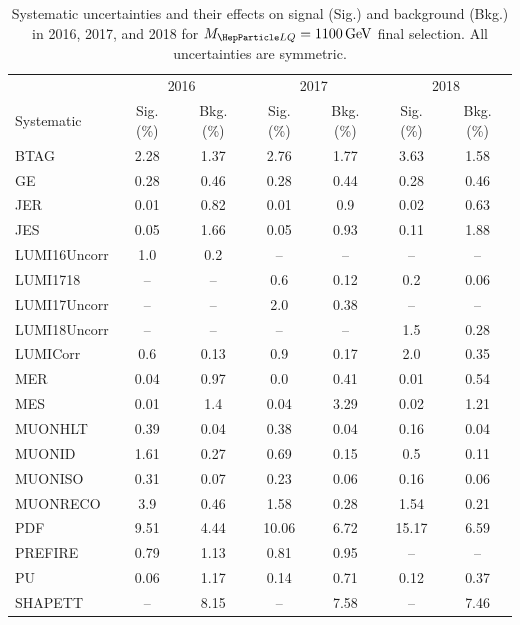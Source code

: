 \begin{table}[H]
	\begin{center}
        \begin{footnotesize}
			\caption{Systematic uncertainties and their effects on signal (Sig.) and background (Bkg.) in 2016, 2017, and 2018 for $\MLQ = \SI{1100}{GeV}$ final selection. All uncertainties are symmetric.}
			\begin{tabular}{lcccccc} \hline \hline
				& \multicolumn{2}{c}{2016} & \multicolumn{2}{c}{2017} & \multicolumn{2}{c}{2018} \\
				Systematic & Sig. (\%) & Bkg. (\%) & Sig. (\%) & Bkg. (\%) & Sig. (\%) & Bkg. (\%) \\ \hline
				BTAG &  2.28  &  1.37 &  2.76  &  1.77 &  3.63  &  1.58 \\
				GE &  0.28  &  0.46 &  0.28  &  0.44 &  0.28  &  0.46 \\
				JER &  0.01  &  0.82 &  0.01  &  0.9 &  0.02  &  0.63 \\
				JES &  0.05  &  1.66 &  0.05  &  0.93 &  0.11  &  1.88 \\
				LUMI16Uncorr &  1.0  &  0.2 & -- & -- & -- & -- \\
				LUMI1718 & -- & -- &  0.6  &  0.12 &  0.2  &  0.06 \\
				LUMI17Uncorr & -- & -- &  2.0  &  0.38 & -- & -- \\
				LUMI18Uncorr & -- & -- & -- & -- &  1.5  &  0.28 \\
				LUMICorr &  0.6  &  0.13 &  0.9  &  0.17 &  2.0  &  0.35 \\
				MER &  0.04  &  0.97 &  0.0  &  0.41 &  0.01  &  0.54 \\
				MES &  0.01  &  1.4 &  0.04  &  3.29 &  0.02  &  1.21 \\
				MUONHLT &  0.39  &  0.04 &  0.38  &  0.04 &  0.16  &  0.04 \\
				MUONID &  1.61  &  0.27 &  0.69  &  0.15 &  0.5  &  0.11 \\
				MUONISO &  0.31  &  0.07 &  0.23  &  0.06 &  0.16  &  0.06 \\
				MUONRECO &  3.9  &  0.46 &  1.58  &  0.28 &  1.54  &  0.21 \\
				PDF &  9.51  &  4.44 &  10.06  &  6.72 &  15.17  &  6.59 \\
				PREFIRE &  0.79  &  1.13 &  0.81  &  0.95 & -- & -- \\
				PU &  0.06  &  1.17 &  0.14  &  0.71 &  0.12  &  0.37 \\
				SHAPETT & -- &  8.15 & -- &  7.58 & -- &  7.46 \\

\end{tabular}
\end{footnotesize}
\end{center}
\end{table}
